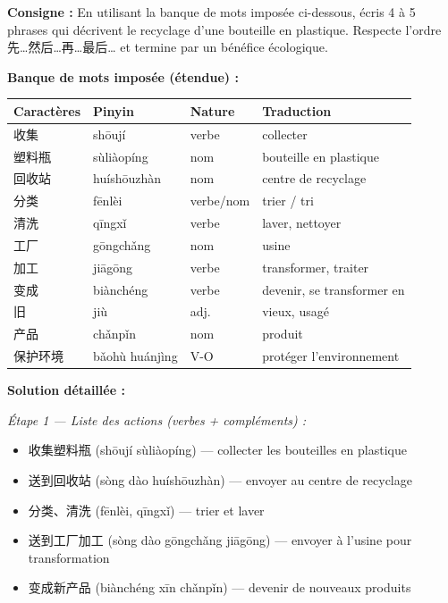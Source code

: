 \documentclass[11pt]{article}
\newcommand{\cle}[1]{{\popxbold\color{popdark}#1}}
\begin{document}
\begin{exoresolu}
\textbf{Consigne :} En utilisant la banque de mots imposée ci-dessous, écris 4 à 5 phrases qui décrivent le recyclage d'une bouteille en plastique. Respecte l'ordre \cle{先…然后…再…最后…} et termine par un bénéfice écologique.

\textbf{Banque de mots imposée (étendue) :}
\begin{center}
\begin{tabularx}{\linewidth}{|X|X|X|X|}
\hline
\rowcolor{popblueL} Caractères & Pinyin & Nature & Traduction \\ \hline
收集 & shōují & verbe & collecter \\ \hline
塑料瓶 & sùliàopíng & nom & bouteille en plastique \\ \hline
回收站 & huíshōuzhàn & nom & centre de recyclage \\ \hline
分类 & fēnlèi & verbe/nom & trier / tri \\ \hline
清洗 & qīngxǐ & verbe & laver, nettoyer \\ \hline
工厂 & gōngchǎng & nom & usine \\ \hline
加工 & jiāgōng & verbe & transformer, traiter \\ \hline
变成 & biànchéng & verbe & devenir, se transformer en \\ \hline
旧 & jiù & adj. & vieux, usagé \\ \hline
产品 & chǎnpǐn & nom & produit \\ \hline
保护环境 & bǎohù huánjìng & V-O & protéger l'environnement \\ \hline
\end{tabularx}
\end{center}

\textbf{Solution détaillée :}

\textit{Étape 1 — Liste des actions (verbes + compléments) :}
\begin{itemize}
\item 收集塑料瓶 (shōují sùliàopíng) — collecter les bouteilles en plastique
\item 送到回收站 (sòng dào huíshōuzhàn) — envoyer au centre de recyclage
\item 分类、清洗 (fēnlèi, qīngxǐ) — trier et laver
\item 送到工厂加工 (sòng dào gōngchǎng jiāgōng) — envoyer à l'usine pour transformation
\item 变成新产品 (biànchéng xīn chǎnpǐn) — devenir de nouveaux produits
\end{itemize}


\end{exoresolu}
\end{document}
